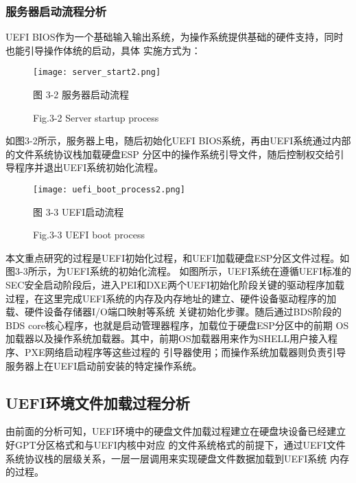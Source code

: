 \subsubsection{服务器启动流程分析}
UEFI BIOS作为一个基础输入输出系统，为操作系统提供基础的硬件支持，同时也能引导操作体统的启动，具体
实施方式为：

\begin{figure}[htb]
    \vspace{0cm}   
    \setlength{\abovecaptionskip}{0.3cm}  
	\centering
    \texttt{[image: server\_start2.png]}
    \caption*{图 3-2 服务器启动流程}
    \setlength{\belowcaptionskip}{-0.7cm}
    \caption*{Fig.3-2 Server startup process}
\end{figure}

如图3-2所示，服务器上电，随后初始化UEFI BIOS系统，再由UEFI系统通过内部的文件系统协议栈加载硬盘ESP
分区中的操作系统引导文件，随后控制权交给引导程序并退出UEFI系统初始化流程。

\begin{figure}[htb]
    \vspace{0cm}   
    \setlength{\abovecaptionskip}{0.3cm}  
	\centering
    \texttt{[image: uefi\_boot\_process2.png]}
    \caption*{图 3-3 UEFI启动流程}
    \setlength{\belowcaptionskip}{-0.7cm}
    \caption*{Fig.3-3 UEFI boot process}
\end{figure}

本文重点研究的过程是UEFI初始化过程，和UEFI加载硬盘ESP分区文件过程。如图3-3所示，为UEFI系统的初始化流程。
如图所示，UEFI系统在遵循UEFI标准的SEC安全启动阶段后，进入PEI和DXE两个UEFI初始化阶段关键的驱动程序加载
过程，在这里完成UEFI系统的内存及内存地址的建立、硬件设备驱动程序的加载、硬件设备存储器I/O端口映射等系统
关键初始化步骤。随后通过BDS阶段的BDS core核心程序，也就是启动管理器程序，加载位于硬盘ESP分区中的前期
OS加载器以及操作系统加载器。其中，前期OS加载器用来作为SHELL用户接入程序、PXE网络启动程序等这些过程的
引导器使用；而操作系统加载器则负责引导服务器上在UEFI启动前安装的特定操作系统。

\subsection{UEFI环境文件加载过程分析}
由前面的分析可知，UEFI环境中的硬盘文件加载过程建立在硬盘块设备已经建立好GPT分区格式和与UEFI内核中对应
的文件系统格式的前提下，通过UEFI文件系统协议栈的层级关系，一层一层调用来实现硬盘文件数据加载到UEFI系统
内存的过程。

